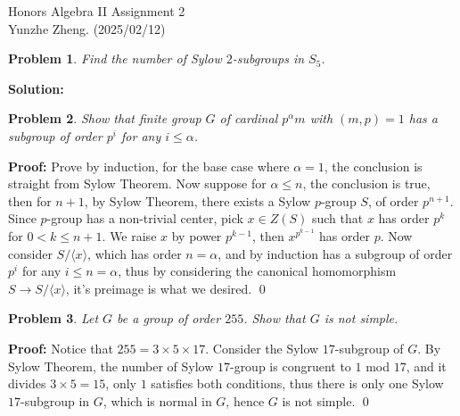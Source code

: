 \documentclass[12pt]{article}
\newtheorem{problem}{Problem}
\begin{document}
\noindent Honors Algebra II \hfill Assignment 2\\
Yunzhe Zheng. (2025/02/12)

\hrulefill

\begin{problem}
Find the number of Sylow $2$-subgroups in $S_{5}$. 
\end{problem}

\textbf{Solution:}  \\

\begin{problem}
Show that finite group $G$ of cardinal $p^{\alpha}m$ with $(m,p)=1$ has a subgroup of order $p^{i}$ for any $i\leq \alpha$.
\end{problem}

\textbf{Proof:} Prove by induction, for the base case where $\alpha = 1$, the conclusion is straight from Sylow Theorem. Now suppose for $\alpha\leq n$, the conclusion is true, then for $n + 1$, by Sylow Theorem, there exists a Sylow $p$-group $S$, of order $p^{n+1}$. Since $p$-group has a non-trivial center, pick $x\in Z(S)$ such that $x$ has order $p^{k}$ for $0<k\leq n + 1$. We raise $x$ by power $p^{k-1}$, then $x^{p^{k-1}}$ has order $p$. Now consider $S/\langle x\rangle$, which has order $n=\alpha$, and by induction has a subgroup of order $p^{i}$ for any $i\leq n=\alpha$, thus by considering the canonical homomorphism $S\to S/\langle x\rangle$, it's preimage is what we desired. \qed \\

\begin{problem}
Let $G$ be a group of order $255$. Show that $G$ is not simple.
\end{problem}

\textbf{Proof:} Notice that $255=3\times 5\times 17$. Consider the Sylow $17$-subgroup of $G$. By Sylow Theorem, the number of Sylow $17$-group is congruent to $1$ mod $17$, and it divides $3 \times 5=15$, only $1$ satisfies both conditions, thus there is only one Sylow $17$-subgroup in $G$, which is normal in $G$, hence $G$ is not simple. \qed
\end{document}
